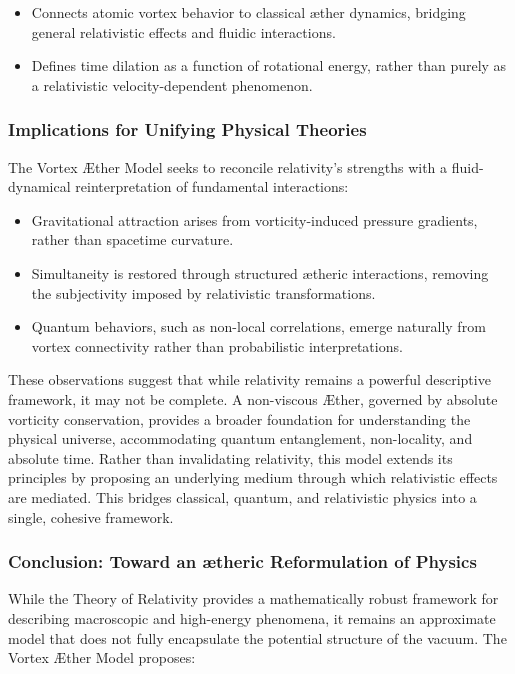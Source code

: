 \begin{itemize}
    \item Connects atomic vortex behavior to classical æther dynamics, bridging general relativistic effects and fluidic interactions.
    \item Defines time dilation as a function of rotational energy, rather than purely as a relativistic velocity-dependent phenomenon.
\end{itemize}
\subsubsection*{Implications for Unifying Physical Theories}
The Vortex Æther Model seeks to reconcile relativity’s strengths with a fluid-dynamical reinterpretation of fundamental interactions:

\begin{itemize}
    \item Gravitational attraction arises from vorticity-induced pressure gradients, rather than spacetime curvature.
    \item Simultaneity is restored through structured ætheric interactions, removing the subjectivity imposed by relativistic transformations.
    \item Quantum behaviors, such as non-local correlations, emerge naturally from vortex connectivity rather than probabilistic interpretations.
\end{itemize}
These observations suggest that while relativity remains a powerful descriptive framework, it may not be complete. A non-viscous Æther, governed by absolute vorticity conservation, provides a broader foundation for understanding the physical universe, accommodating quantum entanglement, non-locality, and absolute time.
Rather than invalidating relativity, this model extends its principles by proposing an underlying medium through which relativistic effects are mediated.
This bridges classical, quantum, and relativistic physics into a single, cohesive framework.

\subsubsection*{Conclusion: Toward an ætheric Reformulation of Physics}
While the Theory of Relativity provides a mathematically robust framework for describing macroscopic and high-energy phenomena, it remains an approximate model that does not fully encapsulate the potential structure of the vacuum.
The Vortex Æther Model proposes:

